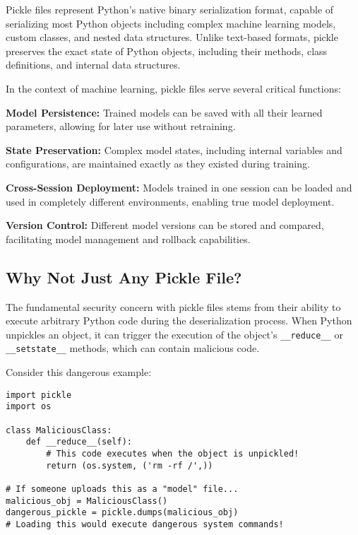 Pickle files represent Python's native binary serialization format, capable of serializing most Python objects including complex machine learning models, custom classes, and nested data structures. Unlike text-based formats, pickle preserves the exact state of Python objects, including their methods, class definitions, and internal data structures.

In the context of machine learning, pickle files serve several critical functions:

\textbf{Model Persistence:} Trained models can be saved with all their learned parameters, allowing for later use without retraining.

\textbf{State Preservation:} Complex model states, including internal variables and configurations, are maintained exactly as they existed during training.

\textbf{Cross-Session Deployment:} Models trained in one session can be loaded and used in completely different environments, enabling true model deployment.

\textbf{Version Control:} Different model versions can be stored and compared, facilitating model management and rollback capabilities.

\subsection{Why Not Just Any Pickle File?}

The fundamental security concern with pickle files stems from their ability to execute arbitrary Python code during the deserialization process. When Python unpickles an object, it can trigger the execution of the object's \texttt{\_\_reduce\_\_} or \texttt{\_\_setstate\_\_} methods, which can contain malicious code.

Consider this dangerous example:

\begin{lstlisting}[language=MyPython, caption={Malicious Pickle Example - DO NOT USE}]
import pickle
import os

class MaliciousClass:
    def __reduce__(self):
        # This code executes when the object is unpickled!
        return (os.system, ('rm -rf /',))

# If someone uploads this as a "model" file...
malicious_obj = MaliciousClass()
dangerous_pickle = pickle.dumps(malicious_obj)
# Loading this would execute dangerous system commands!
\end{lstlisting}

